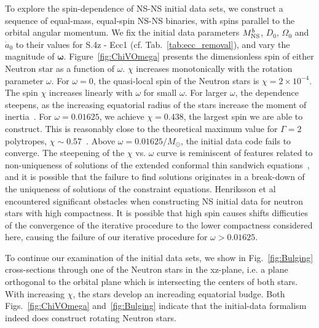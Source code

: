 \documentclass[aps,prd,amsmath,floatfix
,twocolumn
,superscriptaddress,nofootinbib,showpacs]{revtex4-1}
\theoremstyle{plain} \newtheorem{thm}{Theorem} \newtheorem{lem}{Lemma}
\begin{document}
To explore the spin-dependence of NS-NS initial data sets, we
construct a sequence of equal-mass, equal-spin NS-NS binaries, with
spins parallel to the orbital angular momentum.  We fix the initial
data parameters $M^b_{\rm NS}$, $D_0$, $\Omega_0$ and $\dot{a}_0$ to
their values for S.4z - Ecc1 (cf. Tab.~\ref{tab:ecc_removal}), and vary the
magnitude of $\bm\omega$.  Figure~\ref{fig:ChiVOmega} presents the
dimensionless spin of either Neutron star as a function of $\omega$.
$\chi$ increases monotonically with the rotation parameter $\omega$.
For $\omega=0$, the quasi-local spin of the Neutron stars is
$\chi=2\times 10^{-4}$.  The spin $\chi$ increases linearly with
$\omega$ for small $\omega$.  For larger $\omega$, the dependence
steepens, as the increasing equatorial radius of the stars increase
the moment of inertia~\cite{Worley:2008cb}.  For $\omega=0.01625$, we
achieve $\chi=0.438$, the largest spin we are able to construct.  This
is reasonably close to the theoretical maximum value for $\Gamma=2$
polytropes, $\chi\sim 0.57$~\cite{Ansorg:2003br}.  Above
$\omega=0.01625/M_\odot$, the initial data code fails to converge.  The
steepening of the $\chi$ vs. $\omega$ curve is reminiscent of features
related to non-uniqueness of solutions of the extended conformal thin
sandwich equations~\cite{Lovelace2008,Pfeiffer-York:2005,Baumgarte2007,Walsh2007},
and it is possible that the failure to find solutions originates in a
break-down of the uniqueness of solutions of the constraint equations.
Henriksson et al~\cite{Henriksson:2014tba} encountered significant
obstacles when constructing NS initial data for neutron stars with
high compactness.  It is possible that high spin causes shifts
difficuties of the convergence of the iterative procedure to the lower
compactness considered here, causing the failure of our iterative procedure for $\omega>0.01625$.

To continue our examination of the initial data sets, we show in
Fig.~\ref{fig:Bulging} cross-sections through one of the Neutron stars
in the xz-plane, i.e. a plane orthogonal to the orbital plane which is
intersecting the centers of both stars.  With increasing $\chi$, the
stars develop an increading equatorial budge.  Both
Figs.~\ref{fig:ChiVOmega} and~\ref{fig:Bulging} indicate that the
initial-data formalism indeed does construct rotating Neutron stars.

\end{document}
